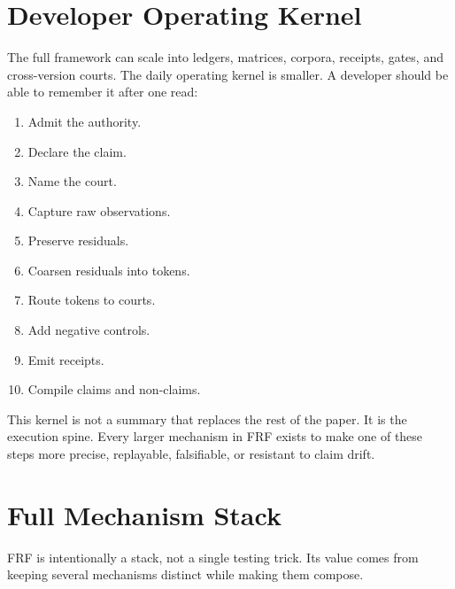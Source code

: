 \documentclass[11pt,a4paper]{article}
\newcommand{\frf}{\textsc{FRF}}
\begin{document}
\section{Developer Operating Kernel}
\label{sec:operating-kernel}

The full framework can scale into ledgers, matrices, corpora, receipts, gates, and cross-version courts. The daily operating kernel is smaller. A developer should be able to remember it after one read:

\begin{enumerate}
\item Admit the authority.
\item Declare the claim.
\item Name the court.
\item Capture raw observations.
\item Preserve residuals.
\item Coarsen residuals into tokens.
\item Route tokens to courts.
\item Add negative controls.
\item Emit receipts.
\item Compile claims and non-claims.
\end{enumerate}

This kernel is not a summary that replaces the rest of the paper. It is the execution spine. Every larger mechanism in \frf{} exists to make one of these steps more precise, replayable, falsifiable, or resistant to claim drift.

\section{Full Mechanism Stack}
\label{sec:mechanism-stack}

\frf{} is intentionally a stack, not a single testing trick. Its value comes from keeping several mechanisms distinct while making them compose.
\end{document}
